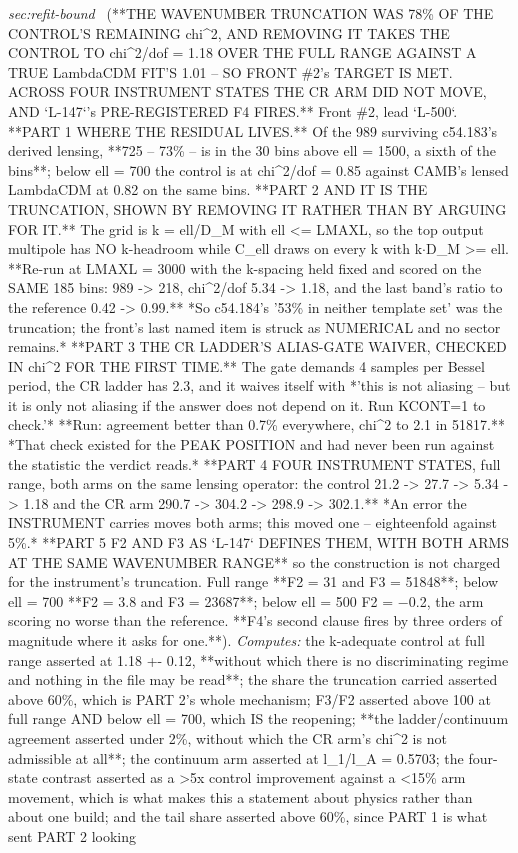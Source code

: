 \begin{description}
\textit{sec:refit-bound} \ (**THE WAVENUMBER TRUNCATION WAS 78\% OF THE CONTROL'S REMAINING chi\textasciicircum{}2, AND REMOVING IT TAKES THE CONTROL TO chi\textasciicircum{}2/dof = 1.18 OVER THE FULL RANGE AGAINST A TRUE LambdaCDM FIT'S 1.01 -- SO FRONT \#2's TARGET IS MET. ACROSS FOUR INSTRUMENT STATES THE CR ARM DID NOT MOVE, AND `L-147`'s PRE-REGISTERED F4 FIRES.** Front \#2, lead `L-500`. **PART 1 WHERE THE RESIDUAL LIVES.** Of the 989 surviving c54.183's derived lensing, **725 -- 73\% -- is in the 30 bins above ell = 1500, a sixth of the bins**; below ell = 700 the control is at chi\textasciicircum{}2/dof = 0.85 against CAMB's lensed LambdaCDM at 0.82 on the same bins. **PART 2 AND IT IS THE TRUNCATION, SHOWN BY REMOVING IT RATHER THAN BY ARGUING FOR IT.** The grid is k = ell/D\_M with ell <= LMAXL, so the top output multipole has NO k-headroom while C\_ell draws on every k with k\ensuremath{\cdot}D\_M >= ell. **Re-run at LMAXL = 3000 with the k-spacing held fixed and scored on the SAME 185 bins: 989 -> 218, chi\textasciicircum{}2/dof 5.34 -> 1.18, and the last band's ratio to the reference 0.42 -> 0.99.** *So c54.184's '53\% in neither template set' was the truncation; the front's last named item is struck as NUMERICAL and no sector remains.* **PART 3 THE CR LADDER'S ALIAS-GATE WAIVER, CHECKED IN chi\textasciicircum{}2 FOR THE FIRST TIME.** The gate demands 4 samples per Bessel period, the CR ladder has 2.3, and it waives itself with *'this is not aliasing -- but it is only not aliasing if the answer does not depend on it. Run KCONT=1 to check.'* **Run: agreement better than 0.7\% everywhere, chi\textasciicircum{}2 to 2.1 in 51817.** *That check existed for the PEAK POSITION and had never been run against the statistic the verdict reads.* **PART 4 FOUR INSTRUMENT STATES, full range, both arms on the same lensing operator: the control 21.2 -> 27.7 -> 5.34 -> 1.18 and the CR arm 290.7 -> 304.2 -> 298.9 -> 302.1.** *An error the INSTRUMENT carries moves both arms; this moved one -- eighteenfold against 5\%.* **PART 5 F2 AND F3 AS `L-147` DEFINES THEM, WITH BOTH ARMS AT THE SAME WAVENUMBER RANGE** so the construction is not charged for the instrument's truncation. Full range **F2 = 31 and F3 = 51848**; below ell = 700 **F2 = 3.8 and F3 = 23687**; below ell = 500 F2 = \ensuremath{-}0.2, the arm scoring no worse than the reference. **F4's second clause fires by three orders of magnitude where it asks for one.**). 
\emph{Computes:} the k-adequate control at full range asserted at 1.18 +- 0.12, **without which there is no discriminating regime and nothing in the file may be read**; the share the truncation carried asserted above 60\%, which is PART 2's whole mechanism; F3/F2 asserted above 100 at full range AND below ell = 700, which IS the reopening; **the ladder/continuum agreement asserted under 2\%, without which the CR arm's chi\textasciicircum{}2 is not admissible at all**; the continuum arm asserted at l\_1/l\_A = 0.5703; the four-state contrast asserted as a >5x control improvement against a <15\% arm movement, which is what makes this a statement about physics rather than about one build; and the tail share asserted above 60\%, since PART 1 is what sent PART 2 looking

\end{description}
